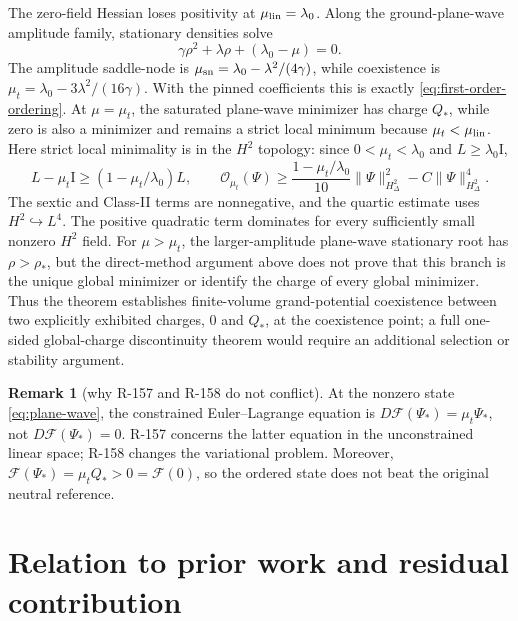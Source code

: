 \documentclass[11pt]{article}
\numberwithin{equation}{section}
\theoremstyle{definition}
\newtheorem{remark}[theorem]{Remark}
\newcommand{\cF}{\mathcal F}
\newcommand{\cO}{\mathcal O}
\newcommand{\Id}{\mathrm I}
\begin{document}
The zero-field Hessian loses positivity at $\mu_{\rm lin}=\lambda_0$.  Along
the ground-plane-wave amplitude family, stationary densities solve
\begin{equation}
 \gamma\rho^2+\lambda\rho+(\lambda_0-\mu)=0.
 \label{eq:amplitude-quadratic}
\end{equation}
The amplitude saddle-node is $\mu_{\rm sn}=\lambda_0-\lambda^2/(4\gamma)$,
while coexistence is $\mu_t=\lambda_0-3\lambda^2/(16\gamma)$.  With the
pinned coefficients this is exactly \eqref{eq:first-order-ordering}.  At
$\mu=\mu_t$, the saturated plane-wave minimizer has charge $Q_*$, while
zero is also a minimizer and remains a strict local minimum because
$\mu_t<\mu_{\rm lin}$.  Here strict local minimality is in the $H^2$
topology: since $0<\mu_t<\lambda_0$ and $L\ge\lambda_0\Id$,
\begin{equation}
 L-\mu_t\Id\ge (1-\mu_t/\lambda_0)L,
 \qquad
 \cO_{\mu_t}(\Psi)\ge
 \frac{1-\mu_t/\lambda_0}{10}\|\Psi\|_{H^2_\Delta}^2
       -C\|\Psi\|_{H^2_\Delta}^4.
 \label{eq:strict-local-zero}
\end{equation}
The sextic and Class-II terms are nonnegative, and the quartic estimate
uses $H^2\hookrightarrow L^4$.  The positive quadratic term dominates
for every sufficiently small nonzero $H^2$ field.  For $\mu>\mu_t$, the larger-amplitude plane-wave
stationary root has $\rho>\rho_*$, but the direct-method argument above does
not prove that this branch is the unique global minimizer or identify the
charge of every global minimizer.  Thus the theorem establishes finite-volume
grand-potential coexistence between two explicitly exhibited charges, $0$ and
$Q_*$, at the coexistence point; a full one-sided global-charge discontinuity
theorem would require an additional selection or stability argument.

\begin{remark}[why R-157 and R-158 do not conflict]
At the nonzero state \eqref{eq:plane-wave}, the constrained Euler--Lagrange
equation is $D\cF(\Psi_*)=\mu_t\Psi_*$, not $D\cF(\Psi_*)=0$.  R-157 concerns
the latter equation in the unconstrained linear space; R-158 changes the
variational problem.  Moreover,
$\cF(\Psi_*)=\mu_tQ_*>0=\cF(0)$, so the ordered state does not beat the
original neutral reference.
\end{remark}

\section{Relation to prior work and residual contribution}
\label{sec:prior-art}
\end{document}
